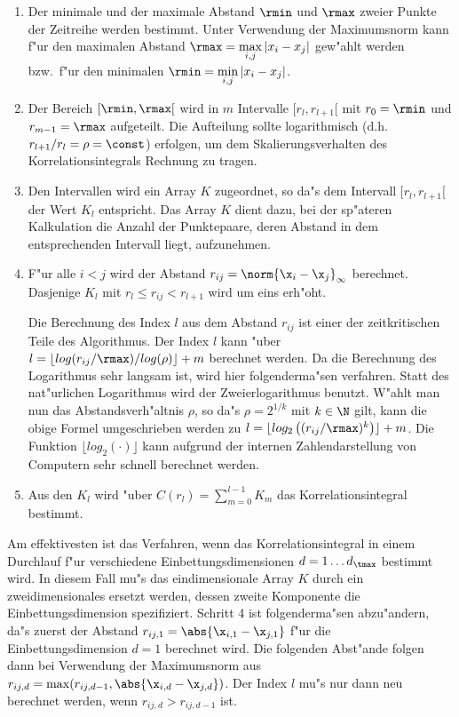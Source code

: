 \begin{enumerate}
\item Der minimale und der maximale Abstand $\rmin$ und $\rmax$ zweier Punkte der
Zeitreihe werden bestimmt. Unter Verwendung der Maximumsnorm kann f"ur den maximalen
Abstand $\rmax=\max\limits_{i,j}{\lvert x_i-x_j \rvert}$ gew"ahlt werden bzw.\  f"ur den
minimalen $\rmin=\min\limits_{i,j}{\lvert x_i-x_j \rvert}$. 
\item Der Bereich $[\rmin,\rmax[$ wird in $m$ Intervalle $[r_l,r_{l+1}[$ mit
$r_0=\rmin$ und $r_{m-1}=\rmax$ aufgeteilt. Die Aufteilung sollte logarithmisch (d.h.\
$r_{l+1}/r_l=\rho=\const$) erfolgen, um dem Skalierungsverhalten des Korrelationsintegrals
Rechnung zu tragen.
\item Den Intervallen wird ein Array $K$ zugeordnet, so da"s dem Intervall $[r_l,r_{l+1}[$
der Wert $K_l$ entspricht. Das Array $K$ dient dazu, bei der sp"ateren Kalkulation die
Anzahl der Punktepaare, deren Abstand in dem entsprechenden Intervall liegt, aufzunehmen.
\item F"ur alle $i<j$ wird der Abstand $r_{ij}=\norm{\x_i-\x_j}_\infty$
berechnet. Dasjenige $K_l$ mit $r_l\leq r_{ij}\lt r_{l+1}$ wird um eins erh"oht.

Die Berechnung des Index $l$ aus dem Abstand $r_{ij}$ ist einer der zeitkritischen Teile 
des Algorithmus. Der Index $l$ kann "uber $l=\lfloor log(r_{ij} / \rmax ) / log(\rho)
\rfloor + m$ berechnet werden. Da die Berechnung des Logarithmus sehr langsam ist, wird
hier folgenderma"sen verfahren. Statt des nat"urlichen Logarithmus wird der
Zweierlogarithmus benutzt. W"ahlt man nun das Abstandsverh"altnis $\rho$, so da"s
$\rho=2^{1/k}$ mit $k\in\N$ gilt, kann die obige Formel umgeschrieben werden zu $l=\lfloor
log_2\left( (r_{ij} / \rmax )^k \right) \rfloor + m$. Die Funktion $\lfloor
log_2(\cdot) \rfloor$ kann aufgrund der internen Zahlendarstellung von Computern sehr
schnell berechnet werden.
\item Aus den $K_l$ wird "uber $C(r_l)=\sum\limits_{m=0}^{l-1} K_m$ das Korrelationsintegral bestimmt. 
\end{enumerate}
Am effektivesten ist das Verfahren, wenn das Korrelationsintegral in einem Durchlauf f"ur verschiedene 
Einbettungsdimensionen $d=1\dots d_\tmax$ bestimmt wird. In diesem Fall mu"s das
eindimensionale Array $K$ durch ein zweidimensionales ersetzt werden, dessen zweite
Komponente die Einbettungsdimension spezifiziert. Schritt 4 ist folgenderma"sen
abzu"andern, da"s zuerst der Abstand $r_{ij,1}=\abs{\x_{i,1}-\x_{j,1}}$ f"ur die
Einbettungsdimension $d=1$ berechnet wird. Die folgenden Abst"ande folgen dann bei Verwendung
der Maximumsnorm aus $r_{ij,d}=\max(r_{ij,d-1},\abs{\x_{i,d}-\x_{j,d}})$. Der Index $l$
mu"s nur dann neu berechnet werden, wenn $r_{ij,d}\gt r_{ij,d-1}$ ist.

